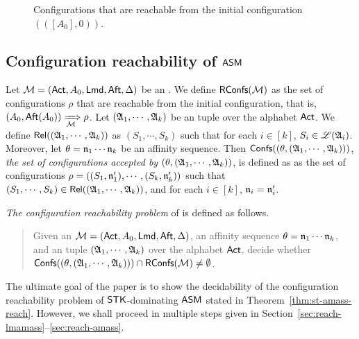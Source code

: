 \begin{example}
\begin{figure}[htbp]
			\caption{Configurations that are reachable from the initial configuration $(([A_0], 0))$.} %
			\label{stk-asm-example}
\end{figure}
\end{example}



\subsection{Configuration reachability of $\textsf{ASM}$} \label{sec-conf-reach}

Let ${\mathcal{M} } =({\sf Act}, A_0, {\sf Lmd}, {\sf Aft}, \Delta)$ be an  {\AMASS}. We define $\mathsf{RConfs}({\mathcal{M} })$ as the set of configurations $\rho$ that are reachable from the initial configuration, that is, 
$(A_0, {\sf Aft}(A_0)) \xRightarrow[{\mathcal{M} }]{} \rho$. 
Let $({\mathfrak{A} }_1,\cdots,{\mathfrak{A} }_k)$ be an {\NFA} tuple over the alphabet ${\sf Act}$. We define $\mathsf{Rel}(({\mathfrak{A} }_1, \cdots, {\mathfrak{A} }_k))$ as $(S_1, \cdots, S_k)$ such that for each $i \in [k]$, $S_i \in {\mathscr{L} }({\mathfrak{A} }_i)$. Moreover, let $\theta = \mathfrak{n}_1\cdots\mathfrak{n}_k$ be an affinity sequence. Then ${\mathsf{Confs} }((\theta, ({\mathfrak{A} }_1,\cdots,{\mathfrak{A} }_k)))$, \emph{the set of configurations accepted by $(\theta, ({\mathfrak{A} }_1,\cdots,{\mathfrak{A} }_k))$}, is defined as as the set of configurations $\rho = ((S_1,\mathfrak{n}'_1),\cdots,(S_k,\mathfrak{n}'_k))$  such that $(S_1, \cdots, S_k) \in \mathsf{Rel}(({\mathfrak{A} }_1, \cdots, {\mathfrak{A} }_k))$, and for each $i \in [k]$, $\mathfrak{n}_i=\mathfrak{n}_i'$.
%

\emph{The configuration reachability problem} of {\AMASS} is defined as follows. 
\begin{quote}
	Given an {\AMASS} ${\mathcal{M} }= ({\sf Act}, A_0, {\sf Lmd}, {\sf Aft}, \Delta)$, an affinity sequence $\theta = \mathfrak{n}_1\cdots\mathfrak{n}_k$, and an {\NFA} tuple $({\mathfrak{A} }_1,\cdots,{\mathfrak{A} }_k)$ over the alphabet ${\sf Act}$, decide whether $ {\mathsf{Confs} }({(\theta, ({\mathfrak{A} }_1,\cdots,{\mathfrak{A} }_k))}) \cap \mathsf{RConfs}({\mathcal{M} }) \neq \emptyset$.
\end{quote}

The ultimate goal of the paper is to show the decidability of the configuration reachability problem of $\mathsf{STK}$-dominating $\textsf{ASM}$  stated in Theorem~\ref{thm:st-amass-reach}. However, we shall proceed in multiple steps given in Section~\ref{sec:reach-lmamass}--\ref{sec:reach-amass}.

